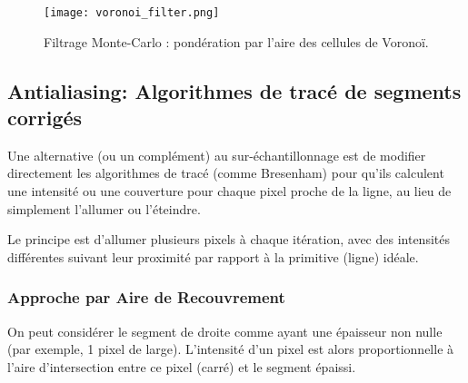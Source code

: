 \documentclass{article}
\begin{document}
\begin{figure}[H]
\centering
\texttt{[image: voronoi\_filter.png]}
\caption{Filtrage Monte-Carlo : pondération par l'aire des cellules de Voronoï.}
\label{fig:voronoi_filter}
\end{figure}

\subsection{Antialiasing: Algorithmes de tracé de segments corrigés}

Une alternative (ou un complément) au sur-échantillonnage est de modifier directement les algorithmes de tracé (comme Bresenham) pour qu'ils calculent une intensité ou une couverture pour chaque pixel proche de la ligne, au lieu de simplement l'allumer ou l'éteindre.

Le principe est d'allumer plusieurs pixels à chaque itération, avec des intensités différentes suivant leur proximité par rapport à la primitive (ligne) idéale.

\subsubsection{Approche par Aire de Recouvrement}
On peut considérer le segment de droite comme ayant une épaisseur non nulle (par exemple, 1 pixel de large). L'intensité d'un pixel est alors proportionnelle à l'aire d'intersection entre ce pixel (carré) et le segment épaissi.
\end{document}
